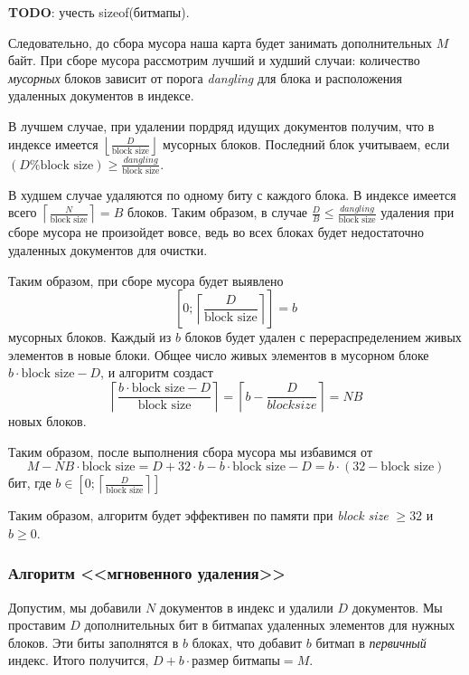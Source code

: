 \textbf{TODO}: учесть sizeof(битмапы).

Следовательно, до сбора мусора наша карта будет занимать дополнительных $M$ байт.
При сборе мусора рассмотрим лучший и худший случаи: количество \textit{мусорных}
блоков зависит от порога \textit{dangling} для блока и расположения удаленных
документов в индексе.

В лучшем случае, при удалении пордряд идущих документов получим, что в индексе
имеется $\left\lfloor\frac{D}{\text{block size}}\right\rfloor$ мусорных блоков.
Последний блок учитываем, если $(D \% \text{block size}) \geq \frac{dangling}{\text{block size}}$.

В худшем случае удаляются по одному биту с
каждого блока. В индексе имеется всего $\left\lceil\frac{N}{\text{block size}}\right\rceil = B$ блоков. Таким
образом, в случае $\frac{D}{B} \leq \frac{dangling}{\text{block size}}$ удаления
при сборе мусора не произойдет вовсе, ведь во всех блоках будет недостаточно
удаленных документов для очистки.

Таким образом, при сборе мусора будет выявлено
$$\left[0;\left\lceil\frac{D}{\text{block size}}\right\rceil\right] = b$$
мусорных блоков. Каждый из $b$ блоков будет удален с перераспределением живых
элементов в новые блоки. Общее число живых элементов в мусорном блоке $b \cdot
\text{block size} - D$, и алгоритм создаст $$\left\lceil\frac{b \cdot
\text{block size} - D}{\text{block size}}\right\rceil = \left\lceil b -
\frac{D}{block size}\right\rceil = NB$$ новых блоков.

Таким образом, после выполнения сбора мусора мы избавимся от $$M - NB\cdot
\text{block size} = D + 32\cdot b - b \cdot \text{block size} - D = b \cdot
(32 - \text{block size})$$ бит, где $b \in \left[0;\left\lceil\frac{D}{\text{block size}}\right\rceil\right]$

Таким образом, алгоритм будет эффективен по памяти при \textit{block size} $\geq 32$ и $b \ge 0$.

\subsubsection{Алгоритм <<мгновенного удаления>>}

Допустим, мы добавили $N$ документов в индекс и удалили $D$ документов. Мы
проставим $D$ дополнительных бит в битмапах удаленных элементов для нужных блоков.
Эти биты заполнятся в $b$ блоках, что добавит $b$ битмап в \textit{первичный}
индекс. Итого получится, $D + b \cdot \text{размер битмапы} = M$.

